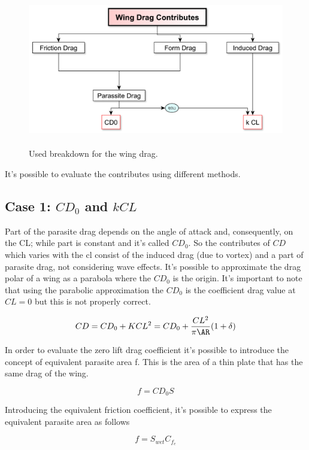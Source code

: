 \begin{figure}[H]
	\centering
	{\includegraphics[height=6cm]{Immagini/dragfactors.pdf}} 
	\caption{Used breakdown for the wing drag.}
	\label{newcomponent}
\end{figure}

It's possible to evaluate the contributes using different methods.

\subsection{Case 1:  $CD_0$  and $k CL$}
Part of the parasite drag depends on the angle of attack and, consequently, on the CL; while part is constant and it's called $CD_0$. So the contributes of $CD$ which varies with the cl consist of the induced drag (due to vortex) and a part of parasite drag, not considering wave effects. It's possible to approximate the drag polar of a wing as a parabola where the $CD_0$ is the origin. It's important to note that using the parabolic approximation the $CD_0$ is the coefficient drag value at $CL=0$ but this is not properly correct.

\begin{equation}
CD = CD_0 + KCL^2 = CD_0 + \frac{CL^2}{\pi \AR}(1+\delta)
\end{equation}

In order to evaluate the zero lift drag coefficient it's possible to introduce the concept of equivalent parasite area f. This is the area of a thin plate that has the same drag of the wing.

\begin{equation}
f = CD_0 S
\label{cd01}
\end{equation}

Introducing the equivalent friction coefficient, it's possible to express the equivalent parasite area as follows

\begin{equation}
f= S_{wet} C_{f_{e}}
\label{cd02}
\end{equation}

